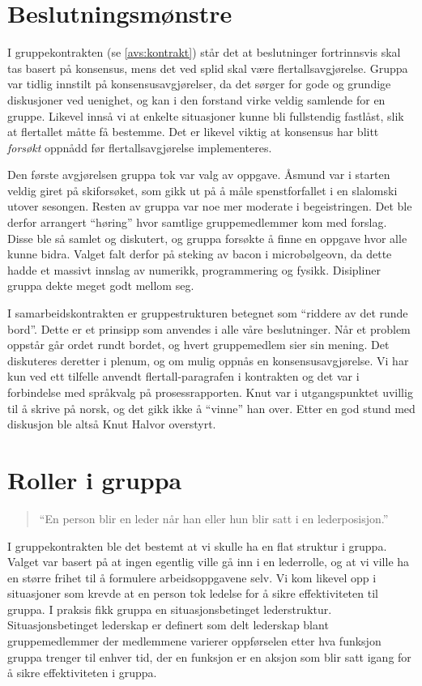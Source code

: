\section{Beslutningsmønstre}
I gruppekontrakten (se \cref{avs:kontrakt}) står det at beslutninger fortrinnsvis
skal tas basert på konsensus, mens det ved splid skal være flertallsavgjørelse.
Gruppa var tidlig innstilt på konsensusavgjørelser, da det sørger for gode og
grundige diskusjoner ved uenighet, og kan i den forstand virke veldig samlende
for en gruppe. Likevel innså vi at enkelte situasjoner kunne bli fullstendig
fastlåst, slik at flertallet måtte få bestemme. Det er likevel viktig at
konsensus har blitt \emph{forsøkt} oppnådd før flertallsavgjørelse
implementeres. 

Den første avgjørelsen gruppa tok var valg av oppgave. Åsmund var i starten
veldig giret på skiforsøket, som gikk ut på å måle spenstforfallet i en
slalomski utover sesongen. Resten av gruppa var noe mer moderate i
begeistringen. Det ble derfor arrangert ``høring'' hvor samtlige gruppemedlemmer
kom med forslag. Disse ble så samlet og diskutert, og gruppa forsøkte å finne en
oppgave hvor alle kunne bidra. Valget falt derfor på steking av bacon i
microbølgeovn, da dette hadde et massivt innslag av numerikk, programmering og
fysikk. Disipliner gruppa dekte meget godt mellom seg. 

I samarbeidskontrakten er gruppestrukturen betegnet som ``riddere av det runde
bord''. Dette er et prinsipp som anvendes i alle våre beslutninger. Når et
problem oppstår går ordet rundt bordet, og hvert gruppemedlem sier sin mening.
Det diskuteres deretter i plenum, og om mulig oppnås en konsensusavgjørelse. Vi
har kun ved ett tilfelle anvendt flertall-paragrafen i kontrakten og det var i
forbindelse med språkvalg på prosessrapporten. Knut var i utgangspunktet uvillig
til å skrive på norsk, og det gikk ikke å ``vinne'' han over. Etter en god stund
med diskusjon ble altså Knut Halvor overstyrt.

\section{Roller i gruppa}
\begin{quote}
``En person blir en leder når han eller hun blir satt i en lederposisjon.''
\end{quote}

I gruppekontrakten ble det bestemt at vi skulle ha en flat struktur i gruppa. Valget 
var basert på at ingen egentlig ville gå inn i en lederrolle, og at vi ville ha en 
større frihet til å formulere arbeidsoppgavene selv. Vi kom likevel opp i situasjoner
som krevde at en person tok ledelse for å sikre effektiviteten til gruppa. I praksis 
fikk gruppa en situasjonsbetinget lederstruktur. Situasjonsbetinget lederskap er definert
som delt lederskap blant gruppemedlemmer der medlemmene varierer oppførselen etter hva
funksjon gruppa trenger til enhver tid, der en funksjon er en aksjon som blir satt 
igang for å sikre effektiviteten i gruppa.


